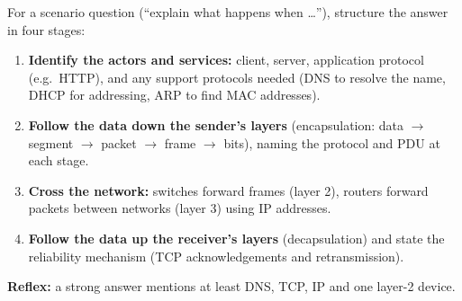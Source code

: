 \documentclass[11pt]{article}
\begin{document}
\begin{methode}
For a scenario question (``explain what happens when \ldots''), structure the answer in four stages:
\begin{enumerate}
\item \textbf{Identify the actors and services:} client, server, application protocol (e.g.\ HTTP), and any support protocols needed (DNS to resolve the name, DHCP for addressing, ARP to find MAC addresses).
\item \textbf{Follow the data down the sender's layers} (encapsulation: data $\rightarrow$ segment $\rightarrow$ packet $\rightarrow$ frame $\rightarrow$ bits), naming the protocol and PDU at each stage.
\item \textbf{Cross the network:} switches forward frames (layer 2), routers forward packets between networks (layer 3) using IP addresses.
\item \textbf{Follow the data up the receiver's layers} (decapsulation) and state the reliability mechanism (TCP acknowledgements and retransmission).
\end{enumerate}
\textbf{Reflex:} a strong answer mentions at least DNS, TCP, IP and one layer-2 device.
\end{methode}
\end{document}
